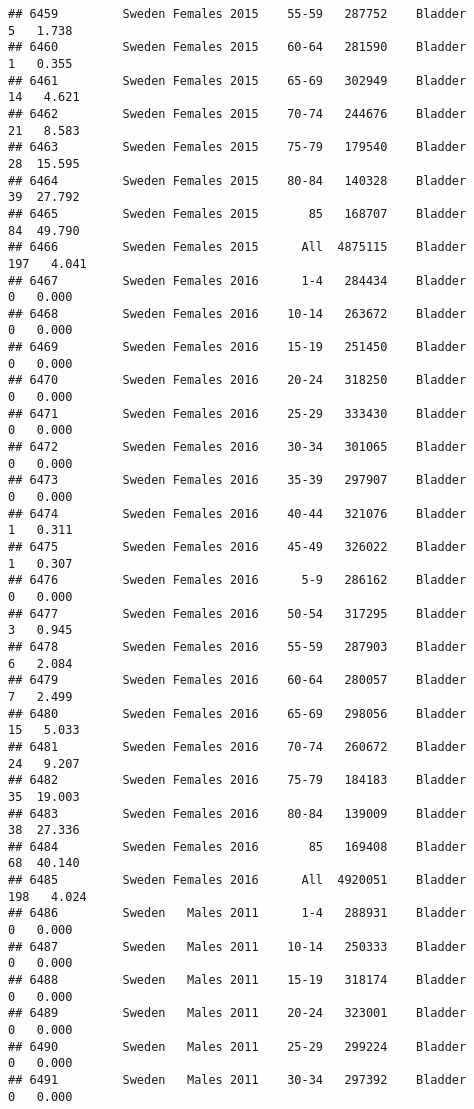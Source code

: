 \documentclass[
]{article}
\begin{document}
\begin{verbatim}
## 6459         Sweden Females 2015    55-59   287752    Bladder      5   1.738
## 6460         Sweden Females 2015    60-64   281590    Bladder      1   0.355
## 6461         Sweden Females 2015    65-69   302949    Bladder     14   4.621
## 6462         Sweden Females 2015    70-74   244676    Bladder     21   8.583
## 6463         Sweden Females 2015    75-79   179540    Bladder     28  15.595
## 6464         Sweden Females 2015    80-84   140328    Bladder     39  27.792
## 6465         Sweden Females 2015       85   168707    Bladder     84  49.790
## 6466         Sweden Females 2015      All  4875115    Bladder    197   4.041
## 6467         Sweden Females 2016      1-4   284434    Bladder      0   0.000
## 6468         Sweden Females 2016    10-14   263672    Bladder      0   0.000
## 6469         Sweden Females 2016    15-19   251450    Bladder      0   0.000
## 6470         Sweden Females 2016    20-24   318250    Bladder      0   0.000
## 6471         Sweden Females 2016    25-29   333430    Bladder      0   0.000
## 6472         Sweden Females 2016    30-34   301065    Bladder      0   0.000
## 6473         Sweden Females 2016    35-39   297907    Bladder      0   0.000
## 6474         Sweden Females 2016    40-44   321076    Bladder      1   0.311
## 6475         Sweden Females 2016    45-49   326022    Bladder      1   0.307
## 6476         Sweden Females 2016      5-9   286162    Bladder      0   0.000
## 6477         Sweden Females 2016    50-54   317295    Bladder      3   0.945
## 6478         Sweden Females 2016    55-59   287903    Bladder      6   2.084
## 6479         Sweden Females 2016    60-64   280057    Bladder      7   2.499
## 6480         Sweden Females 2016    65-69   298056    Bladder     15   5.033
## 6481         Sweden Females 2016    70-74   260672    Bladder     24   9.207
## 6482         Sweden Females 2016    75-79   184183    Bladder     35  19.003
## 6483         Sweden Females 2016    80-84   139009    Bladder     38  27.336
## 6484         Sweden Females 2016       85   169408    Bladder     68  40.140
## 6485         Sweden Females 2016      All  4920051    Bladder    198   4.024
## 6486         Sweden   Males 2011      1-4   288931    Bladder      0   0.000
## 6487         Sweden   Males 2011    10-14   250333    Bladder      0   0.000
## 6488         Sweden   Males 2011    15-19   318174    Bladder      0   0.000
## 6489         Sweden   Males 2011    20-24   323001    Bladder      0   0.000
## 6490         Sweden   Males 2011    25-29   299224    Bladder      0   0.000
## 6491         Sweden   Males 2011    30-34   297392    Bladder      0   0.000

\end{verbatim}
\end{document}

